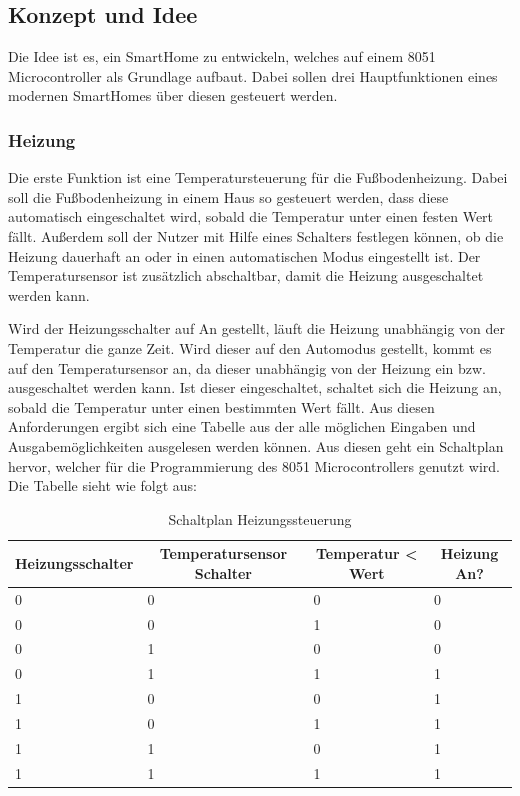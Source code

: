 \subsection{Konzept und Idee}

Die Idee ist es, ein SmartHome zu entwickeln, welches auf einem 8051 Microcontroller als Grundlage aufbaut. Dabei sollen drei Hauptfunktionen eines modernen SmartHomes über diesen gesteuert werden.

\subsubsection{Heizung}
Die erste Funktion ist eine Temperatursteuerung für die Fußbodenheizung. Dabei soll die Fußbodenheizung in einem Haus so gesteuert werden, dass diese automatisch eingeschaltet wird, sobald die Temperatur unter einen festen Wert fällt. Außerdem soll der Nutzer mit Hilfe eines Schalters festlegen können, ob die Heizung dauerhaft an oder in einen automatischen Modus eingestellt ist. Der Temperatursensor ist zusätzlich abschaltbar, damit die Heizung ausgeschaltet werden kann.

Wird der Heizungsschalter auf An gestellt, läuft die Heizung unabhängig von der Temperatur die ganze Zeit. Wird dieser auf den Automodus gestellt, kommt es auf den Temperatursensor an, da dieser unabhängig von der Heizung ein bzw. ausgeschaltet werden kann. Ist dieser eingeschaltet, schaltet sich die Heizung an, sobald die Temperatur unter einen bestimmten Wert fällt.
Aus diesen Anforderungen ergibt sich eine Tabelle aus der alle möglichen Eingaben und Ausgabemöglichkeiten ausgelesen werden können. Aus diesen geht ein Schaltplan hervor, welcher für die Programmierung des 8051 Microcontrollers genutzt wird.
Die Tabelle sieht wie folgt aus:

\begin{table}[htbp]
\centering
\caption{Schaltplan Heizungssteuerung}
\label{my-label}
\begin{tabular}{|l|l|l|l|}
\hline
\multicolumn{1}{|c|}{\textbf{Heizungsschalter}} & \multicolumn{1}{c|}{\textbf{Temperatursensor Schalter}} & \multicolumn{1}{c|}{\textbf{Temperatur < Wert}} & \multicolumn{1}{c|}{\textbf{Heizung An?}} \\ \hline
 0 & 0 & 0 & 0 \\ \hline
 0 & 0 & 1 & 0 \\ \hline
 0 & 1 & 0 & 0 \\ \hline
 0 & 1 & 1 & 1 \\ \hline
 1 & 0 & 0 & 1 \\ \hline
 1 & 0 & 1 & 1 \\ \hline
 1 & 1 & 0 & 1 \\ \hline
 1 & 1 & 1 & 1 \\ \hline
\end{tabular}
\end{table}

